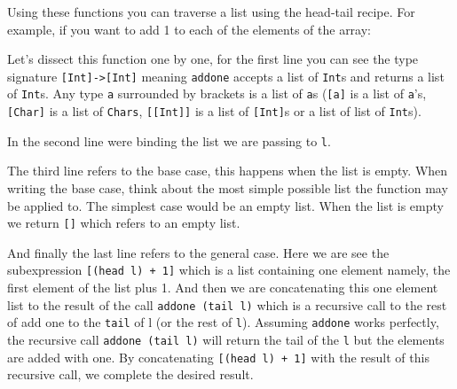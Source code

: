 Using these functions you can traverse a list using the head-tail
recipe. For example, if you want to add 1 to each of the elements of the
array:

\begin{Shaded}
\begin{Highlighting}[]
\NormalTok{ [}\NormalTok{] }\OtherTok{{-}\textgreater{}}\NormalTok{ [}\NormalTok{]}
\OtherTok{=} 
   \OperatorTok{==}  \NormalTok{ []}
  \NormalTok{ [(}\OperatorTok{+} \NormalTok{] }\OperatorTok{++}
\end{Highlighting}
\end{Shaded}

Let's dissect this function one by one, for the first line you can see
the type signature \texttt{{[}Int{]}-\textgreater{}{[}Int{]}} meaning
\texttt{addone} accepts a list of \texttt{Int}s and returns a list of
\texttt{Int}s. Any type \texttt{a} surrounded by brackets is a list of
\texttt{a}s (\texttt{{[}a{]}} is a list of \texttt{a}'s,
\texttt{{[}Char{]}} is a list of \texttt{Chars},
\texttt{{[}{[}Int{]}{]}} is a list of \texttt{{[}Int{]}}s or a list of
list of \texttt{Int}s).

In the second line were binding the list we are passing to \texttt{l}.

The third line refers to the base case, this happens when the list is
empty. When writing the base case, think about the most simple possible
list the function may be applied to. The simplest case would be an empty
list. When the list is empty we return \texttt{{[}{]}} which refers to
an empty list.

And finally the last line refers to the general case. Here we are see
the subexpression \texttt{{[}(head\ l)\ +\ 1{]}} which is a list
containing one element namely, the first element of the list plus 1. And
then we are concatenating this one element list to the result of the
call \texttt{addone\ (tail\ l)} which is a recursive call to the rest of
add one to the \texttt{tail} of l (or the rest of \texttt{l}). Assuming
\texttt{addone} works perfectly, the recursive call
\texttt{addone\ (tail\ l)} will return the tail of the \texttt{l} but
the elements are added with one. By concatenating
\texttt{{[}(head\ l)\ +\ 1{]}} with the result of this recursive call,
we complete the desired result.


